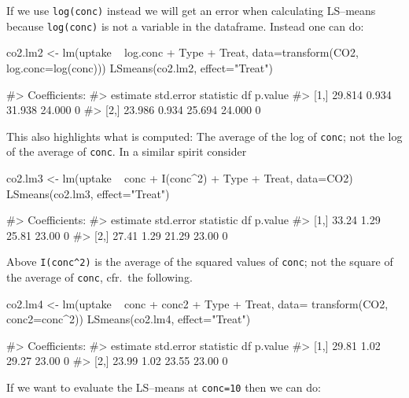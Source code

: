If we use \texttt{log(conc)} instead we will get an error when
calculating LS--means because \texttt{log(conc)} is not a variable in
the dataframe. Instead one can do:

\begin{Schunk}
\begin{Sinput}
co2.lm2 <- lm(uptake ~ log.conc + Type + Treat,
             data=transform(CO2, log.conc=log(conc)))
LSmeans(co2.lm2, effect="Treat")
\end{Sinput}
\begin{Soutput}
#> Coefficients:
#>      estimate std.error statistic     df p.value
#> [1,]   29.814     0.934    31.938 24.000       0
#> [2,]   23.986     0.934    25.694 24.000       0
\end{Soutput}
\end{Schunk}

This also highlights what is computed: The average of the log of
\texttt{conc}; not the log of the average of \texttt{conc}. In a similar
spirit consider

\begin{Schunk}
\begin{Sinput}
co2.lm3 <- lm(uptake ~ conc + I(conc^2) + Type + Treat, data=CO2)
LSmeans(co2.lm3, effect="Treat")
\end{Sinput}
\begin{Soutput}
#> Coefficients:
#>      estimate std.error statistic    df p.value
#> [1,]    33.24      1.29     25.81 23.00       0
#> [2,]    27.41      1.29     21.29 23.00       0
\end{Soutput}
\end{Schunk}

Above \verb'I(conc^2)' is the average of the squared values of
\texttt{conc}; not the square of the average of \texttt{conc}, cfr.~the
following.

\begin{Schunk}
\begin{Sinput}
co2.lm4 <- lm(uptake ~ conc + conc2 + Type + Treat, data=
              transform(CO2, conc2=conc^2))
LSmeans(co2.lm4, effect="Treat")
\end{Sinput}
\begin{Soutput}
#> Coefficients:
#>      estimate std.error statistic    df p.value
#> [1,]    29.81      1.02     29.27 23.00       0
#> [2,]    23.99      1.02     23.55 23.00       0
\end{Soutput}
\end{Schunk}

If we want to evaluate the LS--means at \texttt{conc=10} then we can do:

